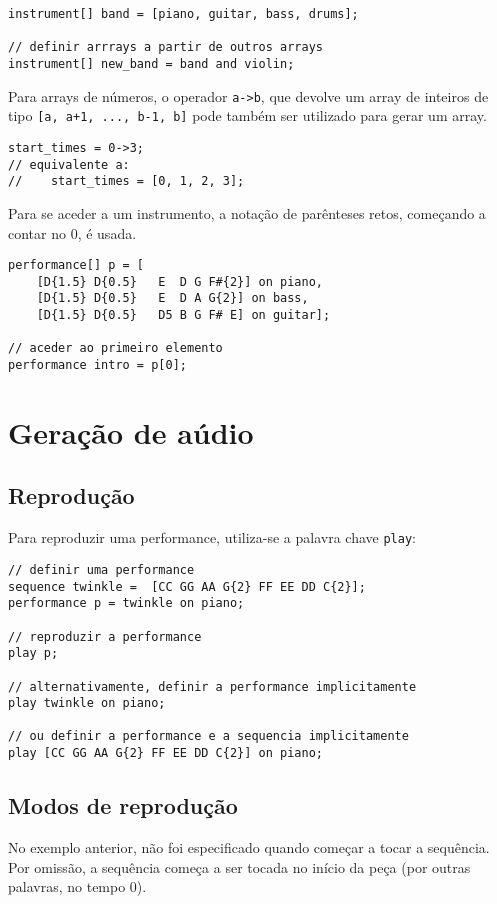 \documentclass{article}
\begin{document}
\begin{lstlisting} 
instrument[] band = [piano, guitar, bass, drums];

// definir arrrays a partir de outros arrays
instrument[] new_band = band and violin;
\end{lstlisting} 

Para arrays de números, o operador \texttt{a->b}, que devolve um array de inteiros de tipo \texttt{[a, a+1, ..., b-1, b]} pode também ser utilizado para gerar um array.
\begin{lstlisting}
start_times = 0->3;
// equivalente a:
//    start_times = [0, 1, 2, 3];
\end{lstlisting}

Para se aceder a um instrumento, a notação de parênteses retos, começando a contar no 0, é usada. %
\begin{lstlisting} 
performance[] p = [
    [D{1.5} D{0.5}   E  D G F#{2}] on piano, 
    [D{1.5} D{0.5}   E  D A G{2}] on bass,
    [D{1.5} D{0.5}   D5 B G F# E] on guitar];
    
// aceder ao primeiro elemento
performance intro = p[0];

\end{lstlisting}

\section{Geração de aúdio} \label{audio}
\subsection{Reprodução}
Para reproduzir uma performance, utiliza-se a palavra chave \texttt{play}:
\begin{lstlisting} 
// definir uma performance
sequence twinkle =  [CC GG AA G{2} FF EE DD C{2}];
performance p = twinkle on piano;

// reproduzir a performance
play p;

// alternativamente, definir a performance implicitamente
play twinkle on piano;

// ou definir a performance e a sequencia implicitamente
play [CC GG AA G{2} FF EE DD C{2}] on piano;
\end{lstlisting} 
\subsection{Modos de reprodução}
No exemplo anterior, não foi especificado quando começar a tocar a sequência. Por omissão, a sequência começa a ser tocada no início da peça (por outras palavras, no tempo 0).
\end{document}
